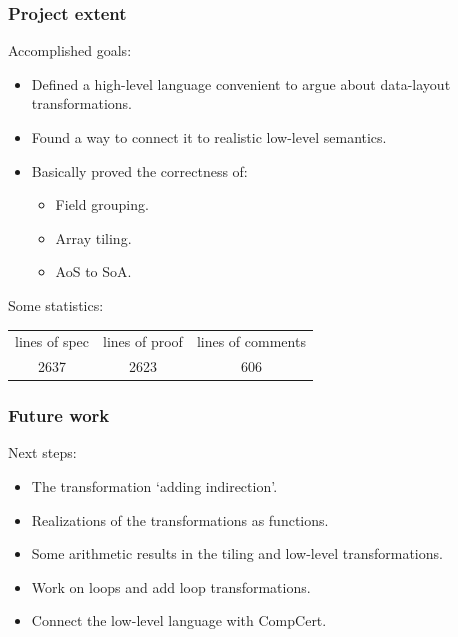 \begin{frame}[fragile]
\frametitle{Project extent}

Accomplished goals:
\\[0.7em]
\begin{itemize}
	\setlength\itemsep{1.5em}
	\item Defined a high-level language convenient to argue about data-layout transformations.
	\item Found a way to connect it to realistic low-level semantics.
	\item Basically proved the correctness of:
	\begin{itemize}
		\item Field grouping.
		\item Array tiling.
		\item AoS to SoA.
	\end{itemize}
\end{itemize}

\bigskip

Some statistics:
\begin{center}
\begin{tabular}{ccc}
lines of spec & lines of proof & lines of comments \\
2637 & 2623 & 606
\end{tabular}
\end{center}

\end{frame}


\begin{frame}[fragile]
\frametitle{Future work}

Next steps:
\\[0.7em]
\begin{itemize}
	\setlength\itemsep{1.5em}
	\item The transformation `adding indirection'.
	\item Realizations of the transformations as functions.
	\item Some arithmetic results in the tiling and low-level transformations.
	\item Work on loops and add loop transformations.
	\item Connect the low-level language with CompCert.
\end{itemize}

\end{frame}


\frame{\titlepage}




